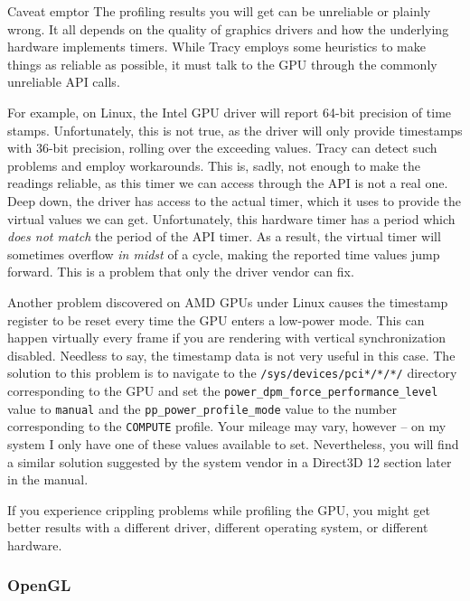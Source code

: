 \documentclass[hidelinks,titlepage,a4paper,twoside]{article}
\begin{document}
\begin{bclogo}[
noborder=true,
couleur=black!5,
logo=\bcattention
]{Caveat emptor}
The profiling results you will get can be unreliable or plainly wrong. It all depends on the quality of graphics drivers and how the underlying hardware implements timers. While Tracy employs some heuristics to make things as reliable as possible, it must talk to the GPU through the commonly unreliable API calls.

For example, on Linux, the Intel GPU driver will report 64-bit precision of time stamps. Unfortunately, this is not true, as the driver will only provide timestamps with 36-bit precision, rolling over the exceeding values. Tracy can detect such problems and employ workarounds. This is, sadly, not enough to make the readings reliable, as this timer we can access through the API is not a real one. Deep down, the driver has access to the actual timer, which it uses to provide the virtual values we can get. Unfortunately, this hardware timer has a period which \emph{does not match} the period of the API timer. As a result, the virtual timer will sometimes overflow \emph{in midst} of a cycle, making the reported time values jump forward. This is a problem that only the driver vendor can fix.

Another problem discovered on AMD GPUs under Linux causes the timestamp register to be reset every time the GPU enters a low-power mode. This can happen virtually every frame if you are rendering with vertical synchronization disabled. Needless to say, the timestamp data is not very useful in this case. The solution to this problem is to navigate to the \texttt{/sys/devices/pci*/*/*/} directory corresponding to the GPU and set the \texttt{power\_dpm\_force\_performance\_level} value to \texttt{manual} and the \texttt{pp\_power\_profile\_mode} value to the number corresponding to the \texttt{COMPUTE} profile. Your mileage may vary, however -- on my system I only have one of these values available to set. Nevertheless, you will find a similar solution suggested by the system vendor in a Direct3D 12 section later in the manual.

If you experience crippling problems while profiling the GPU, you might get better results with a different driver, different operating system, or different hardware.
\end{bclogo}

\subsubsection{OpenGL}
\end{document}
